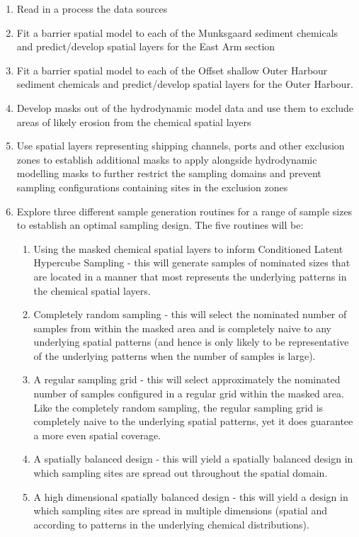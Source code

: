 \documentclass[a4paper]{article}
\begin{document}
\begin{enumerate}
\def\labelenumi{\arabic{enumi}.}
\tightlist
\item
  Read in a process the data sources
\item
  Fit a barrier spatial model to each of the Munksgaard sediment
  chemicals and predict/develop spatial layers for the East Arm section
\item
  Fit a barrier spatial model to each of the Offset shallow Outer
  Harbour sediment chemicals and predict/develop spatial layers for the
  Outer Harbour.
\item
  Develop masks out of the hydrodynamic model data and use them to
  exclude areas of likely erosion from the chemical spatial layers
\item
  Use spatial layers representing shipping channels, ports and other
  exclusion zones to establish additional masks to apply alongside
  hydrodynamic modelling masks to further restrict the sampling domains
  and prevent sampling configurations containing sites in the exclusion
  zones
\item
  Explore three different sample generation routines for a range of
  sample sizes to establish an optimal sampling design. The five
  routines will be:

  \begin{enumerate}
  \def\labelenumii{\alph{enumii})}
  \tightlist
  \item
    Using the masked chemical spatial layers to inform Conditioned
    Latent Hypercube Sampling - this will generate samples of nominated
    sizes that are located in a manner that most represents the
    underlying patterns in the chemical spatial layers.
  \item
    Completely random sampling - this will select the nominated number
    of samples from within the masked area and is completely naive to
    any underlying spatial patterns (and hence is only likely to be
    representative of the underlying patterns when the number of samples
    is large).
  \item
    A regular sampling grid - this will select approximately the
    nominated number of samples configured in a regular grid within the
    masked area. Like the completely random sampling, the regular
    sampling grid is completely naive to the underlying spatial
    patterns, yet it does guarantee a more even spatial coverage.
  \item
    A spatially balanced design - this will yield a spatially balanced
    design in which sampling sites are spread out throughout the spatial
    domain.
  \item
    A high dimensional spatially balanced design - this will yield a
    design in which sampling sites are spread in multiple dimensions
    (spatial and according to patterns in the underlying chemical
    distributions).
  \end{enumerate}
\end{enumerate}
\end{document}
